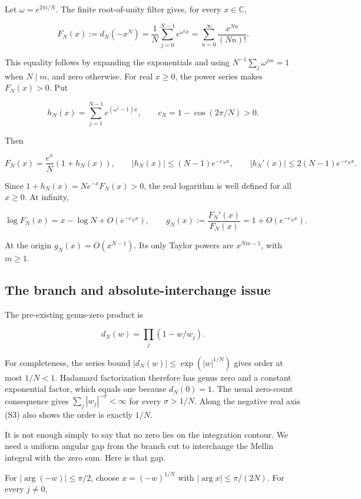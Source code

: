 Let \(\omega=e^{2\pi i/N}\). The finite root-of-unity filter gives, for
every \(x\in\mathbb C\),

\[
F_N(x):=d_N(-x^N)
=\frac1N\sum_{j=0}^{N-1}e^{\omega^j x}
=\sum_{n=0}^{\infty}\frac{x^{Nn}}{(Nn)!}.
\tag{S1}
\]

This equality follows by expanding the exponentials and using
\(N^{-1}\sum_j\omega^{jm}=1\) when \(N\mid m\), and zero otherwise. For
real \(x\ge0\), the power series makes \(F_N(x)>0\). Put

\[
h_N(x)=\sum_{j=1}^{N-1}e^{(\omega^j-1)x},
\qquad c_N=1-\cos(2\pi/N)>0.
\]

Then

\[
F_N(x)=\frac{e^x}{N}(1+h_N(x)),\qquad
|h_N(x)|\le(N-1)e^{-c_Nx},\qquad
|h_N'(x)|\le2(N-1)e^{-c_Nx}.
\tag{S2}
\]

Since \(1+h_N(x)=Ne^{-x}F_N(x)>0\), the real logarithm is well defined
for all \(x\ge0\). At infinity,

\[
\log F_N(x)=x-\log N+O(e^{-c_Nx}),
\qquad g_N(x):=\frac{F_N'(x)}{F_N(x)}
=1+O(e^{-c_Nx}).
\tag{S3}
\]

At the origin \(g_N(x)=O(x^{N-1})\). Its only Taylor powers are
\(x^{Nm-1}\), with \(m\ge1\).

\hypertarget{the-branch-and-absolute-interchange-issue}{%
\subsection{The branch and absolute-interchange
issue}\label{the-branch-and-absolute-interchange-issue}}

The pre-existing genus-zero product is

\[
d_N(w)=\prod_j(1-w/w_j).
\tag{S4}
\]

For completeness, the series bound \(|d_N(w)|\le\exp(|w|^{1/N})\) gives
order at most \(1/N<1\). Hadamard factorization therefore has genus zero
and a constant exponential factor, which equals one because
\(d_N(0)=1\). The usual zero-count consequence gives
\(\sum_j|w_j|^{-\sigma}<\infty\) for every \(\sigma>1/N\). Along the
negative real axis (S3) also shows the order is exactly \(1/N\).

It is not enough simply to say that no zero lies on the integration
contour. We need a uniform angular gap from the branch cut to
interchange the Mellin integral with the zero sum. Here is that gap.

For \(|\arg(-w)|\le\pi/2\), choose \(x=(-w)^{1/N}\) with
\(|\arg x|\le\pi/(2N)\). For every \(j\ne0\),

